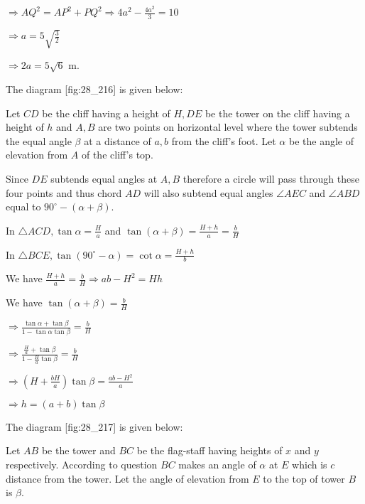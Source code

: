   $\Rightarrow AQ^2 = AP^2 + PQ^2 \Rightarrow 4a^2 - \frac{4a^2}{3} = 10$

  $\Rightarrow a = 5\sqrt{\frac{3}{2}}$

  $\Rightarrow 2a = 5\sqrt{6}$ m.

\item The diagram [fig:28_216] is given below:

  \startplacefigure[reference=fig:28_216]
    \externalfigure[28_216.pdf]
  \stopplacefigure

  Let $CD$ be the cliff having a height of $H, DE$ be the tower on the cliff having a height
  of $h$ and $A, B$ are two points on horizontal level where the tower subtends the equal
  angle $\beta$ at a distance of $a, b$ from the cliff's foot. Let $\alpha$ be the
  angle of elevation from $A$ of the cliff's top.

  Since $DE$ subtends equal angles at $A, B$ therefore a circle will pass through these four
  points and thus chord $AD$ will also subtend equal angles $\angle AEC$ and $\angle
  ABD$ equal to $90^\circ - (\alpha + \beta)$.

  In $\triangle ACD, \tan\alpha = \frac{H}{a}$ and $\tan(\alpha + \beta) = \frac{H + h}{a} =
  \frac{b}{H}$

  In $\triangle BCE, \tan(90^\circ - \alpha) = \cot\alpha = \frac{H + h}{b}$

  We have $\frac{H + h}{a} = \frac{b}{H} \Rightarrow ab - H^2 = Hh$

  We have $\tan(\alpha + \beta) = \frac{b}{H}$

  $\Rightarrow \frac{\tan\alpha + \tan\beta}{1 - \tan\alpha\tan\beta} = \frac{b}{H}$

  $\Rightarrow \frac{\frac{H}{a} + \tan\beta}{1 - \frac{H}{a}\tan\beta} = \frac{b}{H}$

  $\Rightarrow \left(H + \frac{bH}{a}\right)\tan\beta = \frac{ab - H^2}{a}$

  $\Rightarrow h = (a + b)\tan\beta$

\item The diagram [fig:28_217] is given below:

  \startplacefigure[reference=fig:28_217]
    \externalfigure[28_217.pdf]
  \stopplacefigure

  Let $AB$ be the tower and $BC$ be the flag-staff having heights of $x$ and $y$
  respectively. According to question $BC$ makes an angle of $\alpha$ at $E$ which is
  $c$ distance from the tower. Let the angle of elevation from $E$ to the top of tower
  $B$ is $\beta$.

